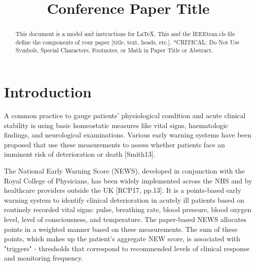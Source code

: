\documentclass[10pt,journal,compsoc]{IEEEtran}
\begin{document}
\title{Conference Paper Title\\
}
\author{}

\maketitle

\begin{abstract}
    This document is a model and instructions for \LaTeX.
    This and the IEEEtran.cls file define the components of your paper [title, text, heads, etc.]. *CRITICAL: Do Not Use Symbols, Special Characters, Footnotes,
    or Math in Paper Title or Abstract.
\end{abstract}

\section{Introduction}
A common practice to gauge patients' physiological condition and acute clinical stability is using basic homeostatic measures like vital signs, haematologic findings, and neurological examinations. Various early warning systems have been proposed that use these measurements to assess whether patients face an imminent risk of deterioration or death [Smith13].

The National Early Warning Score (NEWS), developed in conjunction with the Royal College of Physicians, has been widely implemented across the NHS and by healthcare providers outside the UK [RCP17, pp.13]. It is a points-based early warning system to identify clinical deterioration in acutely ill patients based on routinely recorded vital signs: pulse, breathing rate, blood pressure, blood oxygen level, level of consciousness, and temperature. The paper-based NEWS allocates points in a weighted manner based on these measurements. The sum of these points, which makes up the patient's aggregate NEW score, is associated with "triggers" - thresholds that correspond to recommended levels of clinical response and monitoring frequency.
\end{document}
